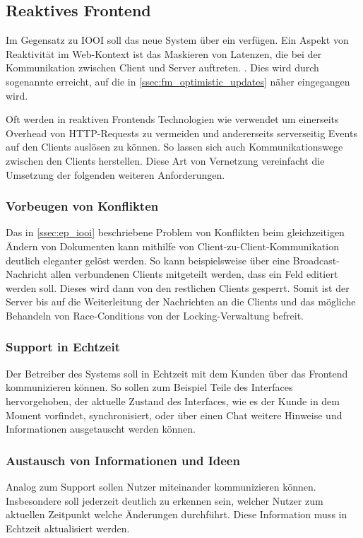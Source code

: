 \subsection{Reaktives Frontend}
\label{ssec:ea_reaktives_frontend}

Im Gegensatz zu IOOI soll das neue System über ein  verfügen.  Ein Aspekt von Reaktivität im Web-Kontext ist das Maskieren
von Latenzen, die bei der Kommunikation zwischen Client und Server auftreten.
\cite{reactive-frontends}.  Dies wird durch sogenannte  erreicht, auf die in \cref{ssec:fm_optimistic_updates} näher
eingegangen wird.

Oft werden in reaktiven Frontends Technologien wie 
\cite{RFC6455} verwendet um einerseits Overhead von HTTP-Requests zu vermeiden
und andererseits serverseitig Events auf den Clients auslösen zu können.  So
lassen sich auch Kommunikationswege zwischen den Clients herstellen.  Diese Art
von Vernetzung vereinfacht die Umsetzung der folgenden weiteren Anforderungen.

\subsubsection{Vorbeugen von Konflikten}
\label{sssec:ear_vorbeugen_von_konflikten}

Das in \cref{ssec:ep_iooi} beschriebene Problem von Konflikten beim
gleichzeitigen Ändern von Dokumenten kann mithilfe von
Client-zu-Client-Kommunikation deutlich eleganter gelöst werden.  So kann
beispielsweise über eine Broadcast-Nachricht allen verbundenen Clients
mitgeteilt werden, dass ein Feld editiert werden soll.  Dieses wird dann von
den restlichen Clients gesperrt.  Somit ist der Server bis auf die
Weiterleitung der Nachrichten an die Clients und das mögliche Behandeln von
Race-Conditions von der Locking-Verwaltung befreit.

\subsubsection{Support in Echtzeit}
\label{sssec:ear_support_in_echtzeit}

Der Betreiber des Systems soll in Echtzeit mit dem Kunden über das Frontend
kommunizieren können.  So sollen zum Beispiel Teile des Interfaces
hervorgehoben, der aktuelle Zustand des Interfaces, wie es der Kunde in dem
Moment vorfindet, synchronisiert, oder über einen Chat weitere Hinweise und
Informationen ausgetauscht werden können.

\subsubsection{Austausch von Informationen und Ideen}
\label{sssec:ear_austausch_von_informationen_und_ideen}

Analog zum Support sollen Nutzer miteinander kommunizieren können.  Insbesondere
soll jederzeit deutlich zu erkennen sein, welcher Nutzer zum aktuellen Zeitpunkt
welche Änderungen durchführt.  Diese Information muss in Echtzeit aktualisiert
werden.
